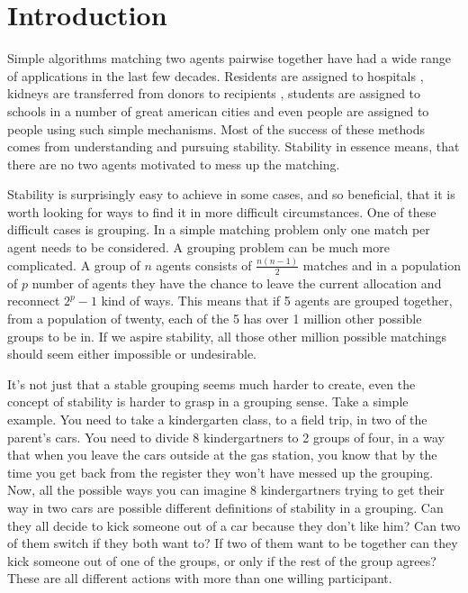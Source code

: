 \documentclass{elsarticle}
\begin{document}


\section{Introduction}


Simple algorithms matching two agents pairwise together have had a wide range of applications in the last few decades. Residents are assigned to hospitals \citep{roth84}, kidneys are transferred from donors to recipients \citep{roth05kid}, students are assigned to schools in a number of great american cities \citep{roth05new,roth05bos} and even people are assigned to people \citep{hitsch10} using such simple mechanisms. Most of the success of these methods comes from understanding and pursuing stability. Stability in essence means, that there are no two agents motivated to mess up the matching.

Stability is surprisingly easy to achieve in some cases, and so beneficial, that it is worth looking for ways to find it in more difficult circumstances. One of these difficult cases is grouping. In a simple matching problem only one match per agent needs to be considered. A grouping problem can be much more complicated. A group of $n$ agents consists of $\frac{n(n-1)}{2}$ matches and in a population of $p$ number of agents they have the chance to leave the current allocation and reconnect $2^p-1$ kind of ways. This means that if 5 agents are grouped together, from a population of twenty, each of the 5 has over 1 million other possible groups to be in. If we aspire stability, all those other million possible matchings should seem either impossible or undesirable.

It's not just that a stable grouping seems much harder to create, even the concept of stability is harder to grasp in a grouping sense. Take a simple example. You need to take a kindergarten class, to a field trip, in two of the parent's cars. You need to divide 8 kindergartners to 2 groups of four, in a way that when you leave the cars outside at the gas station, you know that by the time you get back from the register they won't have messed up the grouping. Now, all the possible ways you can imagine 8 kindergartners trying to get their way in two cars are possible different definitions of stability in a grouping. Can they all decide to kick someone out of a car because they don't like him? Can two of them switch if they both want to? If two of them want to be together can they kick someone out of one of the groups, or only if the rest of the group agrees? These are all different actions with more than one willing participant.
\end{document}
